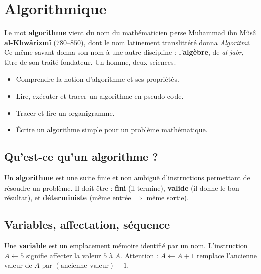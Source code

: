 \chapter{Algorithmique}
\label{chap:algorithmique}


\begin{anecdote}
Le mot \textbf{algorithme} vient du nom du math\'ematicien perse
Muhammad ibn M\^{u}s\^{a} \textbf{al-Khw\^{a}rizm\^{i}} ($780$--$850$),
dont le nom latinement translitt\'er\'e donna \textit{Algoritmi}. Ce m\^{e}me
savant donna son nom \`a une autre discipline : l'\textbf{alg\`ebre},
de \textit{al-jabr}, titre de son trait\'e fondateur. Un homme, deux sciences.
\end{anecdote}

\begin{objectifs}
\begin{itemize}
  \item Comprendre la notion d'algorithme et ses propri\'et\'es.
  \item Lire, ex\'ecuter et tracer un algorithme en pseudo-code.
  \item Tracer et lire un organigramme.
  \item \'Ecrire un algorithme simple pour un probl\`eme math\'ematique.
\end{itemize}
\end{objectifs}

\section{Qu'est-ce qu'un algorithme ?}

\begin{defn}[Algorithme]
Un \textbf{algorithme} est une suite finie et non ambigu\"{e} d'instructions
permettant de r\'esoudre un probl\`eme. Il doit \^{e}tre :
\textbf{fini} (il termine), \textbf{valide} (il donne le bon r\'esultat),
et \textbf{d\'eterministe} (m\^{e}me entr\'ee $\Rightarrow$ m\^{e}me sortie).
\end{defn}

\section{Variables, affectation, s\'equence}

\begin{defn}
Une \textbf{variable} est un emplacement m\'emoire identifi\'e par un nom.
L'instruction $A \leftarrow 5$ signifie \og affecter la valeur $5$ \`a $A$\fg.
Attention : $A \leftarrow A + 1$ remplace l'ancienne valeur de $A$ par
$(\text{ancienne valeur}) + 1$.
\end{defn}

